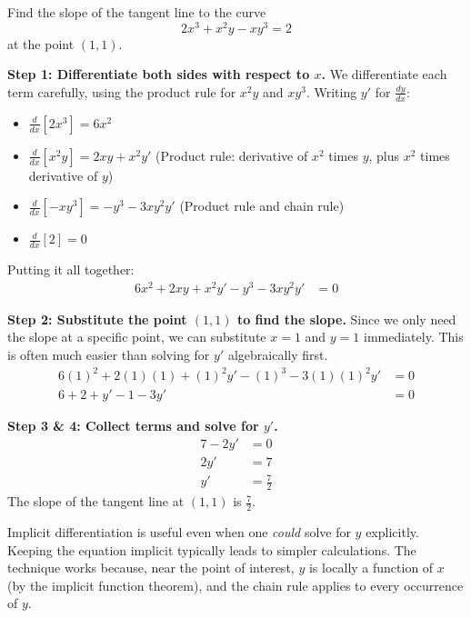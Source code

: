 \begin{example}
\label{ex:3-13-complex}
Find the slope of the tangent line to the curve
\[
  2x^3 + x^2y - xy^3 = 2
\]
at the point $(1, 1)$.

\textbf{Step 1: Differentiate both sides with respect to $x$.}
We differentiate each term carefully, using the product rule for $x^2y$ and $xy^3$. Writing $y'$ for $\frac{dy}{dx}$:
\begin{itemize}
    \item $\frac{d}{dx}[2x^3] = 6x^2$
    \item $\frac{d}{dx}[x^2y] = 2xy + x^2 y'$ (Product rule: derivative of $x^2$ times $y$, plus $x^2$ times derivative of $y$)
    \item $\frac{d}{dx}[-xy^3] = -y^3 - 3xy^2 y'$ (Product rule and chain rule)
    \item $\frac{d}{dx}[2] = 0$
\end{itemize}
Putting it all together:
\begin{align*}
  6x^2 + 2xy + x^2 y' - y^3 - 3xy^2 y' &= 0
\end{align*}

\textbf{Step 2: Substitute the point $(1, 1)$ to find the slope.}
Since we only need the slope at a specific point, we can substitute $x = 1$ and $y = 1$ immediately. This is often much easier than solving for $y'$ algebraically first.
\begin{align*}
  6(1)^2 + 2(1)(1) + (1)^2 y' - (1)^3 - 3(1)(1)^2 y' &= 0 \\
  6 + 2 + y' - 1 - 3y' &= 0
\end{align*}

\textbf{Step 3 \& 4: Collect terms and solve for $y'$.}
\begin{align*}
  7 - 2y' &= 0 \\
  2y' &= 7 \\
  y' &= \frac{7}{2}
\end{align*}
The slope of the tangent line at $(1, 1)$ is $\frac{7}{2}$.
\end{example}

\begin{remark}
Implicit differentiation is useful even when one \emph{could} solve for $y$ explicitly.  Keeping the equation implicit typically leads to simpler calculations.  The technique works because, near the point of interest, $y$ is locally a function of $x$ (by the implicit function theorem), and the chain rule applies to every occurrence of $y$.
\end{remark}
